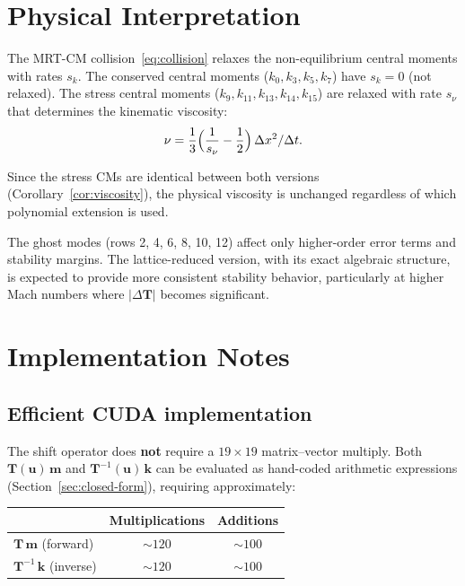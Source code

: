 \documentclass[11pt,a4paper]{article}
\newcommand{\vect}[1]{\bm{#1}}
\newcommand{\mat}[1]{\bm{#1}}
\newcommand{\Tmat}{\mat{T}}
\begin{document}
\section{Physical Interpretation}

The MRT-CM collision~\eqref{eq:collision} relaxes the non-equilibrium central moments with rates $s_k$.
The conserved central moments ($k_0, k_3, k_5, k_7$) have $s_k = 0$ (not relaxed).
The stress central moments ($k_9, k_{11}, k_{13}, k_{14}, k_{15}$) are relaxed with rate $s_{\nu}$ that determines the kinematic viscosity:
\begin{equation}
  \nu = \frac{1}{3}\Bigl(\frac{1}{s_\nu} - \frac{1}{2}\Bigr)\,\Delta x^2 / \Delta t.
\end{equation}

Since the stress CMs are identical between both versions (Corollary~\ref{cor:viscosity}), the physical viscosity is unchanged regardless of which polynomial extension is used.

The ghost modes (rows 2, 4, 6, 8, 10, 12) affect only higher-order error terms and stability margins.
The lattice-reduced version, with its exact algebraic structure, is expected to provide more consistent stability behavior, particularly at higher Mach numbers where $|\Delta\Tmat|$ becomes significant.

\section{Implementation Notes}\label{sec:implementation}

\subsection{Efficient CUDA implementation}

The shift operator does \textbf{not} require a $19\times 19$ matrix--vector multiply.
Both $\Tmat(\vect{u})\,\vect{m}$ and $\Tmat^{-1}(\vect{u})\,\vect{k}$ can be evaluated as hand-coded arithmetic expressions (Section~\ref{sec:closed-form}), requiring approximately:

\begin{center}
\begin{tabular}{lcc}
\toprule
 & Multiplications & Additions \\
\midrule
$\Tmat\,\vect{m}$ (forward) & $\sim 120$ & $\sim 100$ \\
$\Tmat^{-1}\,\vect{k}$ (inverse) & $\sim 120$ & $\sim 100$ \\
\bottomrule
\end{tabular}
\end{center}
\end{document}
